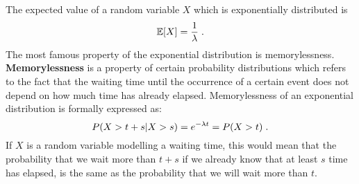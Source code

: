 \documentclass[times, utf8, diplomski]{fer}
\begin{document}
			\noindent The expected value of a random variable $X$ which is exponentially distributed is \begin{equation} \mathbb{E}[X] = \frac{1}{\lambda} \hspace{0.1cm}.\end{equation} The most famous property of the exponential distribution is memorylessness. \textbf{Memorylessness} is a property of certain probability distributions which refers to the fact that the waiting time until the occurrence of a certain event does not depend on how much time has already elapsed. Memorylessness of an exponential distribution is formally expressed as: \begin{equation} P(X > t + s | X>s) = e^{-\lambda t} = P(X > t) \hspace{0.1cm}.\end{equation} If $X$ is a random variable modelling a waiting time, this would mean that the probability that we wait more than $t+s$ if we already know that at least $s$ time has elapsed, is the same as the probability that we will wait more than $t$. 
\end{document}
